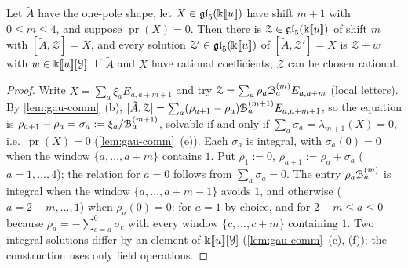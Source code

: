 \begin{lem}[Lifting]
\label{lem:gau-lift}
Let $\tilde A$ have the one-pole shape, let $X\in\mathfrak{gl}_5(\Bbbk[\![ u ]\!])$ have shift $m+1$ with $0\leq m\leq4$, and suppose $\operatorname{pr}(X)=0$. Then there is $\mathcal Z\in\mathfrak{gl}_5(\Bbbk[\![ u ]\!])$ of shift $m$ with $[\tilde A,\mathcal Z]=X$, and every solution $\mathcal Z'\in\mathfrak{gl}_5(\Bbbk[\![ u ]\!])$ of $[\tilde A,\mathcal Z']=X$ is $\mathcal Z+w$ with $w\in\Bbbk[\![ u ]\!][\mathcal Y]$. If $\tilde A$ and $X$ have rational coefficients, $\mathcal Z$ can be chosen rational.
\end{lem}

\begin{proof}
Write $X=\sum_a\xi_aE_{a,a+m+1}$ and try $\mathcal Z=\sum_a\rho_a\mathcal{B}^{(m)}_aE_{a,a+m}$ (local letters). By \cref{lem:gau-comm}~(b), $[\tilde A,\mathcal Z]=\sum_a(\rho_{a+1}-\rho_a)\mathcal{B}^{(m+1)}_aE_{a,a+m+1}$, so the equation is $\rho_{a+1}-\rho_a=\sigma_a:=\xi_a/\mathcal{B}^{(m+1)}_a$, solvable if and only if $\sum_a\sigma_a=\lambda_{m+1}(X)=0$, i.e.\ $\operatorname{pr}(X)=0$ (\cref{lem:gau-comm}~(e)). Each $\sigma_a$ is integral, with $\sigma_a(0)=0$ when the window $\{a,\dots,a+m\}$ contains $1$. Put $\rho_1:=0$, $\rho_{a+1}:=\rho_a+\sigma_a$ ($a=1,\dots,4$); the relation for $a=0$ follows from $\sum_a\sigma_a=0$. The entry $\rho_a\mathcal{B}^{(m)}_a$ is integral when the window $\{a,\dots,a+m-1\}$ avoids $1$, and otherwise ($a=2-m,\dots,1$) when $\rho_a(0)=0$: for $a=1$ by choice, and for $2-m\leq a\leq0$ because $\rho_a=-\sum_{c=a}^0\sigma_c$ with every window $\{c,\dots,c+m\}$ containing $1$. Two integral solutions differ by an element of $\Bbbk[\![ u ]\!][\mathcal Y]$ (\cref{lem:gau-comm}~(c), (f)); the construction uses only field operations.
\end{proof}

